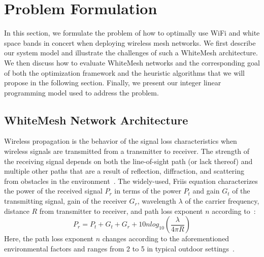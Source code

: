 \section{Problem Formulation}
\label{sec:problemformulation}

%

In this section, we formulate the problem of how to optimally 
use WiFi and white space bands in concert when deploying wireless 
mesh networks.  We first describe our system model and illustrate 
the challenges of such a WhiteMesh architecture.  We then discuss
how to evaluate WhiteMesh networks and the corresponding goal of
both the optimization framework and the heuristic algorithms that 
we will propose in the following section.  Finally, we present 
our integer linear programming model used to address the problem. 
 
\subsection{WhiteMesh Network Architecture}
\label{subsec:architecture}

Wireless propagation is the behavior of the signal loss characteristics 
when wireless signals are transmitted from a transmitter to receiver.
The strength of the receiving signal depends on both the line-of-sight
path (or lack thereof) and multiple other paths that are a result of 
reflection, diffraction, and scattering from obstacles in the 
environment~\cite{andersen1995propagation}. The widely-used, Friis
equation characterizes the power of the received signal $P_r$ in terms 
of the power $P_t$ and gain $G_t$ of the transmitting signal, gain of 
the receiver $G_r$, wavelength $\lambda$ of the carrier frequency, 
distance $R$ from transmitter to receiver, and path loss exponent $n$ according 
to~\cite{friis}:
\begin{equation}
\label{eq:friis}
P_r=P_t+G_t+G_r+10n log_{10}(\frac{\lambda}{4\pi R})
\end{equation}
Here, the path loss exponent $n$ changes according to the
aforementioned environmental factors and ranges from 2 to 5 in typical
outdoor settings~\cite{rappaport}.


